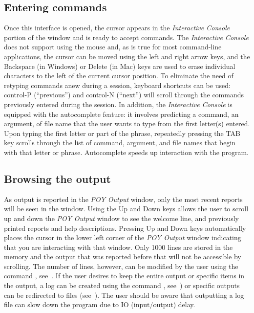 {\subsection{Entering commands}
Once this \poy interface is opened, the cursor appears in the \emph{Interactive Console} portion of the window 
and is ready to accept commands. The \emph{Interactive Console} does not support using the mouse and, as is true for most 
command-line applications, the cursor can be moved using the left and right arrow keys, and the Backspace (in Windows) 
or Delete (in Mac) keys are used to erase individual characters to the left of the current cursor position. To eliminate 
the need of retyping commands anew during a \poy session, keyboard shortcuts can be used: control-P (``previous'') 
and control-N (``next'') will scroll through the commands previously entered during the session. In addition, the 
\emph{Interactive Console} is equipped with the autocomplete feature: it involves \poy predicting a command, an argument, 
of file name that the user wants to type from the first letter(s) entered. Upon typing the first letter or part of the phrase, 
repeatedly pressing the TAB key scrolls through the list of command, argument, and file names that begin with that 
letter or phrase. Autocomplete speeds up interaction with the program.

\subsection{Browsing the output}
As output is reported in the \emph{POY Output} window, only the most recent reports will be seen in the window. 
Using the Up and Down keys allows the user to scroll up and down the \emph{POY Output} window to see the welcome 
line, and previously printed reports and help descriptions. Pressing Up and Down keys automatically places the cursor in 
the lower left corner of the \emph{POY Output} window indicating that you are interacting with that window. Only 1000 
lines are stored in the memory and the output that was reported before that will not be accessible by scrolling. The number 
of lines, however, can be modified by the user using the command , see~. If the user 
desires to keep the entire output or specific items in the output, a log can be created using the command , 
see~) or specific outputs can be redirected to files (see~).  The user should be aware that 
outputting a log file can slow down the program due to IO (input/output) delay.

}
